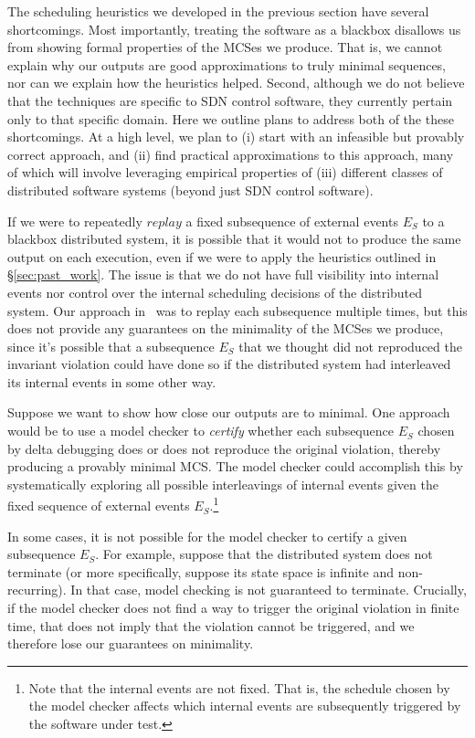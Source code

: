 The scheduling heuristics we developed in the previous section have several
shortcomings. Most importantly, treating the software as a blackbox disallows us
from showing formal properties of the MCSes we produce. That is, we cannot
explain why our outputs are good approximations to truly minimal sequences, nor can we
explain how the heuristics helped. Second,
although we do not believe that the techniques are
specific to SDN control software, they currently pertain only to that specific
domain. Here we outline plans to address both of the these shortcomings.
At a high level, we plan to (i) start with an infeasible but provably correct
approach, and
(ii) find practical approximations to this approach, many of which will
involve leveraging empirical properties of (iii) different classes of distributed software
systems (beyond just SDN control software).

 If we were to repeatedly
$replay$ a
fixed subsequence of external events $E_S$ to a blackbox distributed system,
it is possible that it would not to produce the same output on each
execution, even if we were to apply the heuristics outlined in
\S\ref{sec:past_work}. The issue is that we do not have full visibility into internal
events nor control over the internal scheduling decisions of the distributed
system. Our approach in~\cite{sts2014} was to
replay each subsequence multiple times, but this does not provide any
guarantees on the minimality of the MCSes we produce, since it's possible that
a subsequence $E_S$ that we thought did not reproduced the invariant violation
could have done so if the
distributed system had interleaved its internal events in some other way.

Suppose we want to show how close our outputs are to minimal. One approach would be to use a model checker to
{\em certify} whether each subsequence $E_S$ chosen by delta debugging does or
does not reproduce the original violation, thereby producing a provably
minimal MCS. The model checker could accomplish this
by systematically exploring all possible interleavings of internal events
given the fixed sequence of external events $E_S$.\footnote{Note that the
internal events are not fixed. That is, the schedule chosen by the model
checker affects which internal events are subsequently triggered by the software under
test.}

 In some cases, it is not possible for the model checker to certify a
given subsequence $E_S$. For example, suppose that the distributed system does
not terminate (or more specifically, suppose its state space is infinite
and non-recurring). In that case, model checking is not guaranteed to terminate.
Crucially, if the
model checker does not find a way to trigger the original violation in finite time,
that does not imply that the violation cannot be triggered, and we therefore lose our guarantees on minimality.

